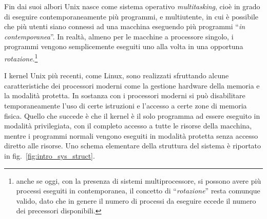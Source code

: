 Fin dai suoi albori Unix nasce come sistema operativo \textit{multitasking},
cioè in grado di eseguire contemporaneamente più programmi, e multiutente, in
cui è possibile che più utenti siano connessi ad una macchina eseguendo più
programmi ``\textsl{in contemporanea}''. In realtà, almeno per le macchine a
processore singolo, i programmi vengono semplicemente eseguiti uno alla volta
in una opportuna \textsl{rotazione}.\footnote{anche se oggi, con la presenza
  di sistemi multiprocessore, si possono avere più processi eseguiti in
  contemporanea, il concetto di ``\textsl{rotazione}'' resta comunque valido,
  dato che in genere il numero di processi da eseguire eccede il numero dei
  precessori disponibili. }


I kernel Unix più recenti, come Linux, sono realizzati sfruttando alcune
caratteristiche dei processori moderni come la gestione hardware della memoria
e la modalità protetta. In sostanza con i processori moderni si può
disabilitare temporaneamente l'uso di certe istruzioni e l'accesso a certe
zone di memoria fisica.  Quello che succede è che il kernel è il solo
programma ad essere eseguito in modalità privilegiata, con il completo accesso
a tutte le risorse della macchina, mentre i programmi normali vengono eseguiti
in modalità protetta senza accesso diretto alle risorse.  Uno schema
elementare della struttura del sistema è riportato in
fig.~\ref{fig:intro_sys_struct}.

